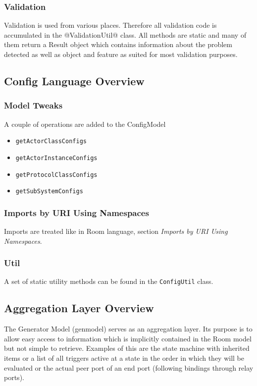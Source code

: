 \subsubsection{Validation}

Validation is used from various places. Therefore all validation code is accumulated in the 
@ValidationUtil@ class. All methods are static and many of them return a Result object which contains 
information about the problem detected as well as object and feature as suited for most validation purposes.

\subsection{Config Language Overview}

\subsubsection{Model Tweaks}

A couple of operations are added to the ConfigModel
\begin{itemize}
\item \texttt{getActorClassConfigs}
\item \texttt{getActorInstanceConfigs}
\item \texttt{getProtocolClassConfigs}
\item \texttt{getSubSystemConfigs}
\end{itemize}

\subsubsection{Imports by URI Using Namespaces}

Imports are treated like in Room language, section \textit{Imports by URI Using Namespaces}.

\subsubsection{Util}

A set of static utility methods can be found in the \texttt{ConfigUtil} class.

\subsection{Aggregation Layer Overview}

The \eTrice{} Generator Model (genmodel) serves as an aggregation layer. Its purpose is to allow easy access 
to information which is implicitly contained in the Room model but not simple to retrieve.
Examples of this are the state machine with inherited items or a list of all triggers active at a state in 
the order in which they will be evaluated or the actual peer port of an end port (following bindings 
through relay ports).

